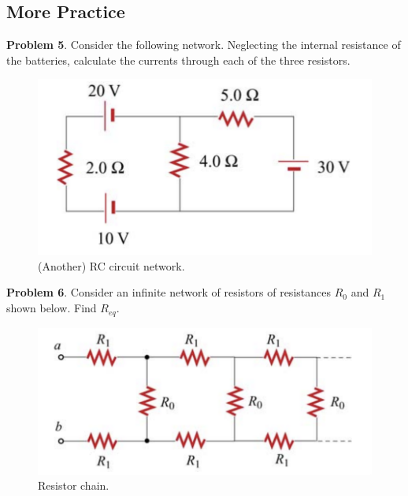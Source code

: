 \documentclass[11pt, letterpaper]{article}
\begin{document}
\subsection{More Practice}
\textbf{Problem 5}. Consider the following network. Neglecting the internal resistance of the batteries, calculate the currents through each of the three resistors.
\begin{figure}[h!]
	\centering
	\includegraphics[scale=0.4]{p2}
	\caption{(Another) RC circuit network.}
	\label{fig:p2}
\end{figure}

\textbf{Problem 6}. Consider an infinite network of resistors of resistances $R_0$ and $R_1$ shown below. Find $R_{eq}$.
\begin{figure}[h!]
	\centering
	\includegraphics[scale=0.45]{p3}
	\caption{Resistor chain.}
	\label{fig:p3}
\end{figure}
\end{document}
